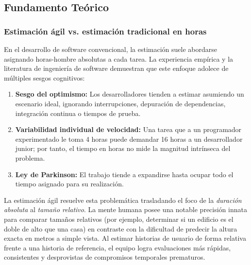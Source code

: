 \subsection{Fundamento Teórico}

\subsubsection{Estimación ágil vs. estimación tradicional en horas}
En el desarrollo de software convencional, la estimación suele abordarse asignando horas-hombre absolutas a cada tarea. La experiencia empírica y la literatura de ingeniería de software demuestran que este enfoque adolece de múltiples sesgos cognitivos:
\begin{enumerate}
    \item \textbf{Sesgo del optimismo:} Los desarrolladores tienden a estimar asumiendo un escenario ideal, ignorando interrupciones, depuración de dependencias, integración continua o tiempos de prueba.
    \item \textbf{Variabilidad individual de velocidad:} Una tarea que a un programador experimentado le toma 4 horas puede demandar 16 horas a un desarrollador junior; por tanto, el tiempo en horas no mide la magnitud intrínseca del problema.
    \item \textbf{Ley de Parkinson:} El trabajo tiende a expandirse hasta ocupar todo el tiempo asignado para su realización.
\end{enumerate}

La estimación ágil resuelve esta problemática trasladando el foco de la \textit{duración absoluta} al \textit{tamaño relativo}. La mente humana posee una notable precisión innata para comparar tamaños relativos (por ejemplo, determinar si un edificio es el doble de alto que una casa) en contraste con la dificultad de predecir la altura exacta en metros a simple vista. Al estimar historias de usuario de forma relativa frente a una historia de referencia, el equipo logra evaluaciones más rápidas, consistentes y desprovistas de compromisos temporales prematuros.


